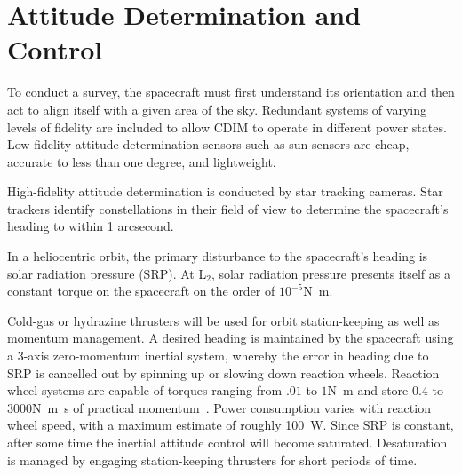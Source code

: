 \documentclass{ws-jai}
\begin{document}


\section{Attitude Determination and Control}
\label{sec:adcs}
To conduct a survey, the spacecraft must first understand its orientation and then act to align itself with a given area of the sky.
Redundant systems of varying levels of fidelity are included to allow CDIM to operate in different power states.
Low-fidelity attitude determination sensors such as sun sensors are cheap, accurate to less than one degree, and lightweight.

High-fidelity attitude determination is conducted by star tracking cameras.
Star trackers identify constellations in their field of view to determine the spacecraft's heading to within 1 arcsecond.


In a heliocentric orbit, the primary disturbance to the spacecraft's heading is solar radiation pressure (SRP).
At L$_2$, solar radiation pressure presents itself as a constant torque on the spacecraft on the order of $10^{-5}$\si{\newton\meter}.

Cold-gas or hydrazine thrusters will be used for orbit station-keeping as well as momentum management.
A desired heading is maintained by the spacecraft using a 3-axis zero-momentum inertial system, whereby the error in heading due to SRP is cancelled out by spinning up or slowing down reaction wheels.
Reaction wheel systems are capable of torques ranging from $.01$ to $1$\si{\newton\meter} and store $0.4$ to $3000$\si{\newton\meter\second} of practical momentum~\cite{smad2015}.
Power consumption varies with reaction wheel speed, with a maximum estimate of roughly \SI{100}{\watt}.
Since SRP is constant, after some time the inertial attitude control will become saturated.
Desaturation is managed by engaging station-keeping thrusters for short periods of time.
\end{document}
